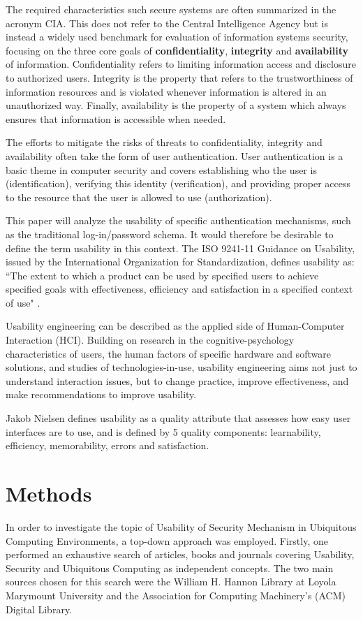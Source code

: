 \documentclass{article}
\begin{document}
The required characteristics such secure systems are often summarized in the acronym CIA. This does not refer to the Central Intelligence Agency but is instead a widely used benchmark for evaluation of information systems security, focusing on the three core goals of \textbf{confidentiality}, \textbf{integrity} and \textbf{availability} of information. Confidentiality refers to limiting information access and disclosure to authorized users. Integrity is the property that refers to the trustworthiness of information resources and is violated whenever information is altered in an unauthorized way. Finally, availability is the property of a system which always ensures that information is accessible when needed. 

The efforts to mitigate the risks of threats to confidentiality, integrity and availability often take the form of user authentication. User authentication is a basic theme in computer security and covers establishing who the user is (identification), verifying this identity (verification), and providing proper access to the resource that the user is allowed to use (authorization). 

This paper will analyze the usability of specific authentication mechanisms, such as the traditional log-in/password schema. It would therefore be desirable to define the term usability in this context. The ISO 9241-11 Guidance on Usability, issued by the International Organization for Standardization, defines usability as: ``The extent to which a product can be used by specified users to achieve specified goals with effectiveness, efficiency and satisfaction in a specified context of use" \cite{iso1998international}.

Usability engineering can be described as the applied side of Human-Computer Interaction (HCI). Building on research in the cognitive-psychology characteristics of users, the human factors of specific hardware and software solutions, and studies of technologies-in-use, usability engineering aims not just to understand interaction issues, but to change practice, improve effectiveness, and make recommendations to improve usability.  

Jakob Nielsen\cite{nielsenusability2012} defines usability as a quality attribute that assesses how easy user interfaces are to use, and is defined by 5 quality components: learnability, efficiency, memorability, errors and satisfaction. 

\section{Methods}
In order to investigate the topic of Usability of Security Mechanism in Ubiquitous Computing Environments, a top-down approach was employed. Firstly, one performed an exhaustive search of articles, books and journals covering Usability, Security and Ubiquitous Computing as independent concepts. The two main sources chosen for this search were the William H. Hannon Library at Loyola Marymount University and the Association for Computing Machinery’s (ACM) Digital Library.  
\end{document}
